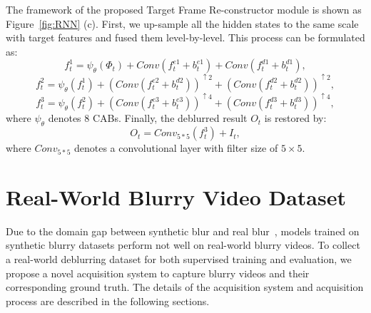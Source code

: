 \documentclass[letterpaper]{article} \usepackage{aaai22}  \usepackage{times}  \usepackage{helvet}  \usepackage{courier}  \usepackage[hyphens]{url}  \usepackage{graphicx} \urlstyle{rm} \def\UrlFont{\rm}  \usepackage{natbib}  \usepackage{caption} \DeclareCaptionStyle{ruled}{labelfont=normalfont,labelsep=colon,strut=off} \frenchspacing  \setlength{\pdfpagewidth}{8.5in}  \setlength{\pdfpageheight}{11in}  \newcommand{\hang}{\textcolor[rgb]{0.98,0.5,0.04}}
\begin{document}
The framework of the proposed Target Frame Re-constructor module is shown as Figure~\ref{fig:RNN} (c).
First, we up-sample all the hidden states to the same scale with target features and fused them level-by-level.
This process can be formulated as:
\begin{equation}\label{eqn:8}
f^1_{t} =  \psi _\theta(\Phi_t) + Conv(f^{e1}_{t}+b^{e1}_{t}) +  Conv(f^{d1}_{t}+b^{d1}_{t}),
\end{equation}
\begin{equation}\label{eqn:9}
f^2_{t} =  \psi_\theta(f^1_{t}) + (Conv(f^{e2}_{t}+b^{d2}_{t}))^{\uparrow 2} + (Conv(f^{d2}_{t}+b^{d2}_{t}))^{\uparrow 2},
\end{equation}
\begin{equation}\label{eqn:10}
f^3_{t} =  \psi_\theta(f^2_{t}) + (Conv(f^{e3}_{t}+b^{e3}_{t}))^{\uparrow 4} + (Conv(f^{d3}_{t}+b^{d3}_{t}))^{\uparrow 4},
\end{equation}
where $\psi_\theta$ denotes 8 CABs.
Finally, the deblurred result $O_t$ is restored by:
\begin{equation}\label{eqn:11}
O_t = Conv_{5*5}(f^3_{t}) + I_t,
\end{equation}
where $Conv_{5*5}$ denotes a convolutional layer with filter size of $5 \times 5$.


\section{Real-World Blurry Video Dataset}
\vspace{-0.5mm}
Due to the domain gap between synthetic blur and real blur~\cite{8953368}, models trained on synthetic blurry datasets perform not well on real-world blurry videos.
To collect a real-world deblurring dataset for both supervised training and evaluation, we propose a novel acquisition system to capture blurry videos and their corresponding ground truth.
The details of the acquisition system and acquisition process are described in the following sections.
\end{document}
